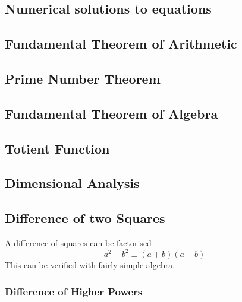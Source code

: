 \subsection{Numerical solutions to equations}

\subsection{Fundamental Theorem of Arithmetic}

\subsection{Prime Number Theorem}

\subsection{Fundamental Theorem of Algebra}

\subsection{Totient Function} \label{sec_totient}

\subsection{Dimensional Analysis}

\subsection{Difference of two Squares}

A difference of squares can be factorised
\begin{equation}
a^2 - b^2 \equiv (a + b)(a - b)
\end{equation}
This can be verified with fairly simple
algebra.

\subsubsection{Difference of Higher Powers}

